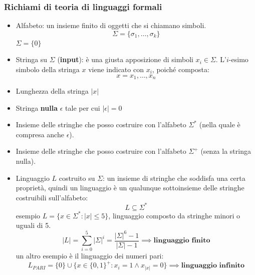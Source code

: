 \documentclass{article}
\begin{document}
\subsubsection{Richiami di teoria di linguaggi formali}
\begin{itemize}
    \item Alfabeto: un insieme finito di oggetti che si chiamano simboli.
          $$\Sigma=\{\sigma_1,\dots,\sigma_k\}$$
          $\Sigma=\{0\}$
    \item Stringa su $\Sigma$ (\textbf{input}): è una giusta apposizione di simboli $x_i\in\Sigma$.
          L'$i$-esimo simbolo della stringa $x$ viene indicato con $x_i$, poiché composta:
          $$x=x_1,\dots,x_n$$
    \item Lunghezza della stringa $|x|$
    \item Stringa \textbf{nulla} $\epsilon$ tale per cui $|\epsilon|=0$
    \item Insieme delle stringhe che posso costruire con l'alfabeto $\Sigma^*$ (nella quale è compresa anche $\epsilon$).
    \item Insieme delle stringhe che posso costruire con l'alfabeto $\Sigma^+$ (senza la stringa nulla).
    \item Linguaggio $L$ costruito su $\Sigma$: un insieme di stringhe che soddisfa una certa proprietà,
          quindi un linguaggio è un qualunque sottoinsieme delle stringhe costruibili sull'alfabeto:
          $$L\subseteq\Sigma^*$$
          esempio $L=\{x\in\Sigma^*:|x|\leq 5\}$, linguaggio composto da stringhe minori o uguali di 5.
          $$|L|=\sum_{i=0}^5|\Sigma|^i=\frac{{|\Sigma|}^6-1}{|\Sigma|-1}\implies\textbf{linguaggio finito}$$
          un altro esempio è il linguaggio dei numeri pari:
          $$L_{PARI}=\{0\} \cup \{x\in\{0,1\}^+ : x_i=1 \land x_{|x|}=0\} \implies\textbf{linguaggio infinito}$$
\end{itemize}
\end{document}
